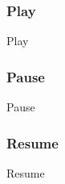 \subsubsection{Play}
\begin{usecase}{Play}
    \precondition{
	    
    }
    \postconditions{
	    \item 
	    \item 
    }
    \mainsuccess{
	    \item 
    }
    \extensions{
	    \item[1.a]
		    \begin{enumerate}
			\item 
		    \end{enumerate}
    }
\end{usecase}
\newpage 
% 
\subsubsection{Pause}
\begin{usecase}{Pause}
    \precondition{
	    
    }
    \postconditions{
	    \item 
	    \item 
    }
    \mainsuccess{
	    \item 
    }
    \extensions{
	    \item[1.a]
		    \begin{enumerate}
			\item 
		    \end{enumerate}
    }
\end{usecase}
\newpage 
% 
\subsubsection{Resume}
\begin{usecase}{Resume}
    \precondition{
	    
    }
    \postconditions{
	    \item 
	    \item 
    }
    \mainsuccess{
	    \item 
    }
    \extensions{
	    \item[1.a]
		    \begin{enumerate}
			\item 
		    \end{enumerate}
    }
\end{usecase}
\newpage 
% 
